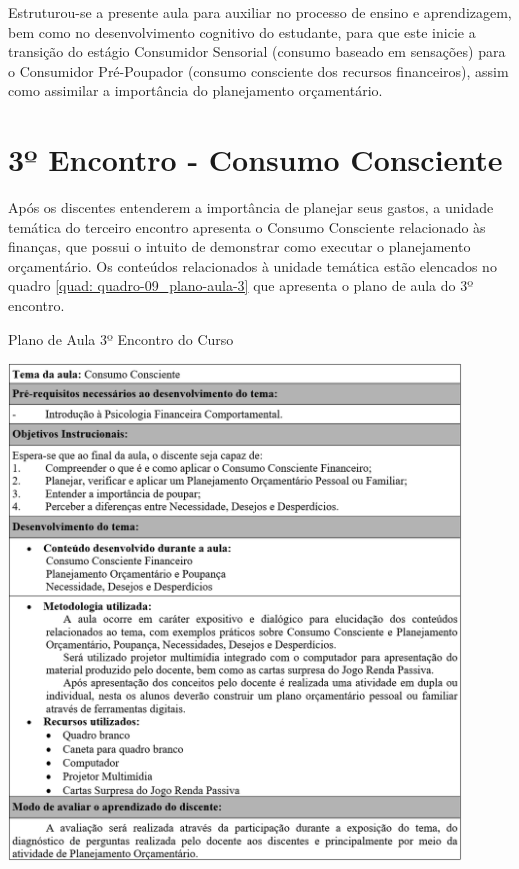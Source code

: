 Estruturou-se a presente aula para auxiliar no processo de ensino e aprendizagem, bem como no desenvolvimento cognitivo do estudante, para que este inicie a transição do estágio Consumidor Sensorial (consumo baseado em sensações) para o Consumidor Pré-Poupador (consumo consciente dos recursos financeiros), assim como assimilar a importância do planejamento orçamentário.

\section{3º Encontro - Consumo Consciente}
Após os discentes entenderem a importância de planejar seus gastos, a unidade temática do terceiro encontro apresenta o Consumo Consciente relacionado às finanças, que possui o intuito de demonstrar como executar o planejamento orçamentário. Os conteúdos relacionados à unidade temática estão elencados no quadro \ref{quad: quadro-09_plano-aula-3} que apresenta o plano de aula do 3º encontro.

\graphicspath{{quadros/}} 
\begin{quadro}[!ht]
\centering
\begin{minipage}{1.\textwidth}
\caption{Plano de Aula 3º Encontro do Curso}
\centering
\includegraphics[width=0.9\textwidth]{quadro-09_plano-aula-3}
\label{quad: quadro-09_plano-aula-3}
\end{minipage}
\end{quadro}

